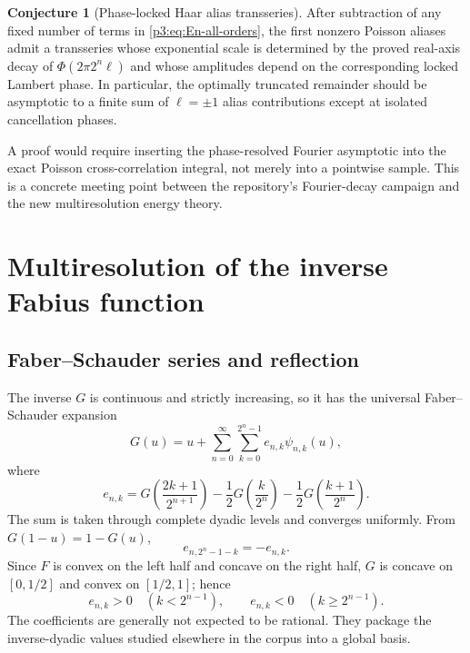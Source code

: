 \documentclass[11pt]{article}
\theoremstyle{definition}
\newtheorem{conjecture}[theorem]{Conjecture}
\theoremstyle{remark}
\begin{document}
\begin{conjecture}[Phase-locked Haar alias transseries]
\label{p3:conj:Haar-alias}
After subtraction of any fixed number of terms in
\eqref{p3:eq:En-all-orders}, the first nonzero Poisson aliases admit a transseries
whose exponential scale is determined by the proved real-axis decay of
$\Phi(2\pi2^n\ell)$ and whose amplitudes depend on the corresponding locked
Lambert phase.  In particular, the optimally truncated remainder should be
asymptotic to a finite sum of $\ell=\pm1$ alias contributions except at isolated
cancellation phases.
\end{conjecture}

A proof would require inserting the phase-resolved Fourier asymptotic into the
exact Poisson cross-correlation integral, not merely into a pointwise sample.
This is a concrete meeting point between the repository's Fourier-decay campaign
and the new multiresolution energy theory.

\section{Multiresolution of the inverse Fabius function}
\label{p3:sec:inverse-multiresolution}

\subsection{Faber--Schauder series and reflection}

The inverse $G$ is continuous and strictly increasing, so it has the universal
Faber--Schauder expansion
\begin{equation}\label{p3:eq:G-Schauder}
 G(u)=u+\sum_{n=0}^\infty\sum_{k=0}^{2^n-1}
 e_{n,k}\psi_{n,k}(u),
\end{equation}
where
\begin{equation}\label{p3:eq:e-inverse-Schauder}
 e_{n,k}=G\!\left(\frac{2k+1}{2^{n+1}}\right)
 -\frac12G\!\left(\frac{k}{2^n}\right)
 -\frac12G\!\left(\frac{k+1}{2^n}\right).
\end{equation}
The sum is taken through complete dyadic levels and converges uniformly.  From
$G(1-u)=1-G(u)$,
\begin{equation}\label{p3:eq:e-inverse-antisymmetry}
 e_{n,2^n-1-k}=-e_{n,k}.
\end{equation}
Since $F$ is convex on the left half and concave on the right half, $G$ is
concave on $[0,1/2]$ and convex on $[1/2,1]$; hence
\begin{equation}\label{p3:eq:e-inverse-sign}
 e_{n,k}>0\quad(k<2^{n-1}),
 \qquad
 e_{n,k}<0\quad(k\ge2^{n-1}).
\end{equation}
The coefficients are generally not expected to be rational.  They package the
inverse-dyadic values studied elsewhere in the corpus into a global basis.
\end{document}

